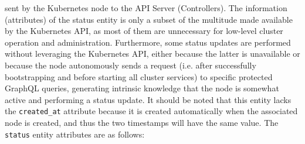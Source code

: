 sent by the Kubernetes node to the API Server (Controllers). The information (attributes)
of the status entity is only a subset of the multitude made available by the Kubernetes
API, as most of them are unnecessary for low-level cluster operation and
administration. Furthermore, some status updates are performed without
leveraging the Kubernetes API, either because the latter is unavailable or because
the node autonomously sends a request (i.e. after successfully bootstrapping and
before starting all cluster services) to specific protected GraphQL queries, generating
intrinsic knowledge that the node is somewhat active and performing a status update.
\newline
It should be noted that this entity lacks the \texttt{created\_at} attribute because
it is created automatically when the associated node is created, and thus the
two timestamps will have the same value.
\newline
The \texttt{status} entity attributes are as follows:

